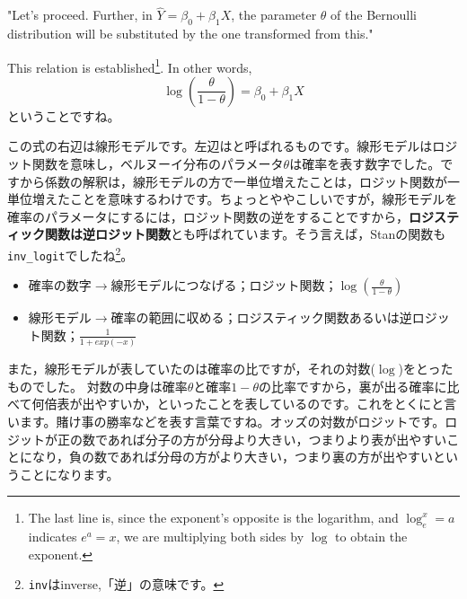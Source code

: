 \documentclass{ltjsbook}
\begin{document}
"Let's proceed. Further, in $\hat{Y} = \beta_0 + \beta_1 X$, the parameter $\theta$ of the Bernoulli distribution will be substituted by the one transformed from this."

This relation is established\footnote {The last line is, since the exponent's opposite is the logarithm, and $\log_e^x=a$ indicates $e^a=x$, we are multiplying both sides by $\log$ to obtain the exponent. }. In other words,
\[ \log\left(\frac{\theta}{1-\theta}\right) =  \beta_0 + \beta_1 X \]
ということですね。

この式の右辺は線形モデルです。左辺はと呼ばれるものです。線形モデルはロジット関数を意味し，ベルヌーイ分布のパラメータ$\theta$は確率を表す数字でした。ですから係数の解釈は，線形モデルの方で一単位増えたことは，ロジット関数が一単位増えたことを意味するわけです。ちょっとややこしいですが，線形モデルを確率のパラメータにするには，ロジット関数の逆をすることですから，\textbf{ロジスティック関数は逆ロジット関数}とも呼ばれています。そう言えば，Stanの関数も\verb|inv_logit|でしたね\footnote{\texttt{inv}はinverse,「逆」の意味です。}。
\begin{itemize}
	\item 確率の数字$\to$線形モデルにつなげる；ロジット関数；$\log \left( \frac{\theta}{1-\theta} \right) $
	\item 線形モデル$\to$確率の範囲に収める；ロジスティック関数あるいは逆ロジット関数；$\frac{1}{1+exp(-x)}$
\end{itemize}

また，線形モデルが表していたのは確率の比ですが，それの対数($\log$)をとったものでした。
対数の中身は確率$\theta$と確率$1-\theta$の比率ですから，裏が出る確率に比べて何倍表が出やすいか，といったことを表しているのです。これをとくにと言います。賭け事の勝率などを表す言葉ですね。オッズの対数がロジットです。ロジットが正の数であれば分子の方が分母より大きい，つまりより表が出やすいことになり，負の数であれば分母の方がより大きい，つまり裏の方が出やすいということになります。
\end{document}

